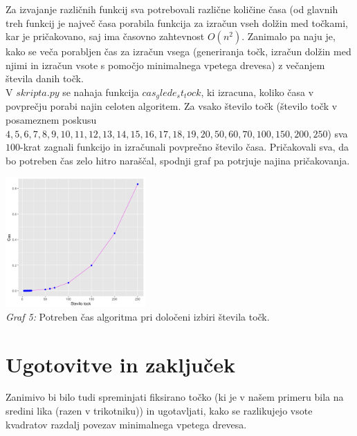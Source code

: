 \documentclass[a4paper]{report}
\begin{document}
Za izvajanje različnih funkcij sva potrebovali različne količine časa (od glavnih treh funkcij je največ časa porabila funkcija za izračun vseh dolžin med točkami, kar je pričakovano, saj ima časovno zahtevnost $O(n^2)$. Zanimalo pa naju je, kako se veča porabljen čas za izračun vsega (generiranja točk, izračun dolžin med njimi in izračun vsote s pomočjo minimalnega vpetega drevesa) z večanjem števila danih točk. \\
V \colorbox{gray!10}{$skripta.py$} se nahaja funkcija $cas_glede_st_tock$, ki izracuna, koliko časa v povprečju porabi najin celoten algoritem. Za vsako število točk (število točk v posameznem poskusu $4, 5, 6, 7, 8, 9, 10, 11, 12, 13, 14, 15, 16, 17, 18, 19, 20, 50, 60, 70, 100, 150, 200, 250$) sva $100$-krat zagnali funkcijo in izračunali povprečno število časa. Pričakovali sva, da bo potreben čas zelo hitro naraščal, spodnji graf pa potrjuje najina pričakovanja.
\begin{center}
\includegraphics[width=0.4\textwidth]{graf_cas} \\
\scriptsize{\textit{Graf 5: }  Potreben čas algoritma pri določeni izbiri števila točk.}
\end{center}
\section{Ugotovitve in zaključek}

Zanimivo bi bilo tudi spreminjati fiksirano točko (ki je v našem primeru bila na sredini lika (razen v trikotniku)) in ugotavljati, kako se razlikujejo vsote kvadratov razdalj povezav minimalnega vpetega drevesa. \\
\end{document}
